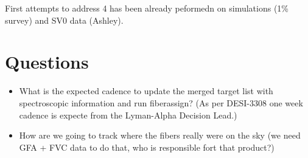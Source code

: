 \documentclass{article}
\begin{document}
First attempts to address 4 has been already peformedn on simulations
(1\% survey) and SV0 data (Ashley).  
 


\section*{Questions}
\begin{itemize}
\item What is the expected cadence to update the merged target list with
  spectroscopic information and run fiberassign? (As per DESI-3308 one
  week cadence is expecte from the Lyman-Alpha Decision Lead.)
\item How are we going to track where the fibers really were on the
  sky (we need GFA + FVC data to do that, who is responsible fort that
  product?)
\end{itemize}
\end{document}
